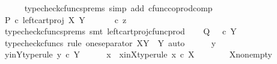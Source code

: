 \begin{isabellebody}
\ \ \ \ \isamarkupfalse%
\ {\isacharparenleft}{\kern0pt}typecheck{\isacharunderscore}{\kern0pt}cfuncs{\isacharunderscore}{\kern0pt}prems{\isacharcomma}{\kern0pt}\ simp\ add{\isacharcolon}{\kern0pt}\ cfunc{\isacharunderscore}{\kern0pt}coprod{\isacharunderscore}{\kern0pt}comp{\isacharparenright}{\kern0pt}\isanewline
\ \ \isamarkupfalse%
\ \isamarkupfalse%
\ {\isachardoublequoteopen}P\ {\isasymcirc}\isactrlsub c\ left{\isacharunderscore}{\kern0pt}cart{\isacharunderscore}{\kern0pt}proj\ X\ Y\ {\isacharequal}{\kern0pt}\ {\isacharparenleft}{\kern0pt}{\isasymt}\ {\isasymamalg}\ {\isasymf}\ {\isasymamalg}\ {\isasymf}{\isacharparenright}{\kern0pt}\ {\isasymcirc}\isactrlsub c\ z{\isachardoublequoteclose}\isanewline
\ \ \ \ \isamarkupfalse%
\ {\isacharparenleft}{\kern0pt}typecheck{\isacharunderscore}{\kern0pt}cfuncs{\isacharunderscore}{\kern0pt}prems{\isacharcomma}{\kern0pt}\ smt\ left{\isacharunderscore}{\kern0pt}cart{\isacharunderscore}{\kern0pt}proj{\isacharunderscore}{\kern0pt}cfunc{\isacharunderscore}{\kern0pt}prod{\isacharparenright}{\kern0pt}\isanewline
\isanewline
\ \ \isamarkupfalse%
\ {\isachardoublequoteopen}Q\ {\isacharequal}{\kern0pt}\ {\isasymt}\ {\isasymcirc}\isactrlsub c\ {\isasymbeta}\isactrlbsub Y\isactrlesub {\isachardoublequoteclose}\isanewline
\ \ \isamarkupfalse%
\ {\isacharparenleft}{\kern0pt}typecheck{\isacharunderscore}{\kern0pt}cfuncs{\isacharcomma}{\kern0pt}\ rule\ one{\isacharunderscore}{\kern0pt}separator{\isacharbrackleft}{\kern0pt}\ X{\isacharequal}{\kern0pt}Y{\isacharcomma}{\kern0pt}\ \ Y{\isacharequal}{\kern0pt}{\isasymOmega}{\isacharbrackright}{\kern0pt}{\isacharcomma}{\kern0pt}\ auto{\isacharparenright}{\kern0pt}\isanewline
\ \ \ \ \isamarkupfalse%
\ y\isanewline
\ \ \ \ \isamarkupfalse%
\ y{\isacharunderscore}{\kern0pt}in{\isacharunderscore}{\kern0pt}Y{\isacharbrackleft}{\kern0pt}type{\isacharunderscore}{\kern0pt}rule{\isacharbrackright}{\kern0pt}{\isacharcolon}{\kern0pt}\ {\isachardoublequoteopen}y\ {\isasymin}\isactrlsub c\ Y{\isachardoublequoteclose}\isanewline
\ \ \ \ \isamarkupfalse%
\ x\ \ x{\isacharunderscore}{\kern0pt}in{\isacharunderscore}{\kern0pt}X{\isacharbrackleft}{\kern0pt}type{\isacharunderscore}{\kern0pt}rule{\isacharbrackright}{\kern0pt}{\isacharcolon}{\kern0pt}\ {\isachardoublequoteopen}x\ {\isasymin}\isactrlsub c\ X{\isachardoublequoteclose}\isanewline
\ \ \ \ \ \ \isamarkupfalse%
\ X{\isacharunderscore}{\kern0pt}nonempty\ \isamarkupfalse%

\end{isabellebody}
